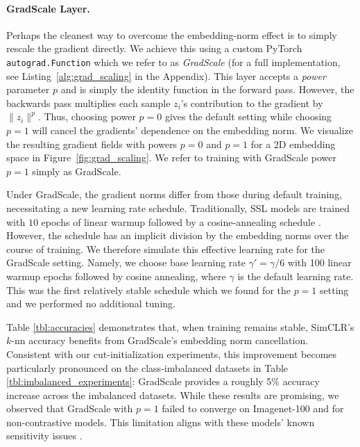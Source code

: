 \paragraph{GradScale Layer.}

Perhaps the cleanest way to overcome the embedding-norm effect is to simply rescale the gradient directly. We achieve this using a custom PyTorch \texttt{autograd.Function} which we refer to as \emph{GradScale} (for a full implementation, see Listing~\ref{alg:grad_scaling} in the Appendix). This layer accepts a \emph{power} parameter $p$ and is simply the identity function in the forward pass. However, the backwards pass multiplies each sample $z_i$'s contribution to the gradient by $\|z_i\|^p$. Thus, choosing power $p=0$ gives the default setting while choosing $p=1$ will cancel the gradients' dependence on the embedding norm. We visualize the resulting gradient fields with powers $p=0$ and $p=1$ for a 2D embedding space in Figure~\ref{fig:grad_scaling}. We refer to training with GradScale power $p=1$ simply as GradScale.

Under GradScale, the gradient norms differ from those during default training, necessitating a new learning rate schedule. Traditionally, SSL models are trained with $10$ epochs of linear warmup followed by a cosine-annealing schedule \citep{simclr}. However, the schedule has an implicit division by the embedding norms over the course of training. 
We therefore simulate this effective learning rate for the GradScale setting. Namely, we choose base learning rate $\gamma' = \gamma/6$ with 100 linear warmup epochs followed by cosine annealing, where $\gamma$ is the default learning rate. This was the first relatively stable schedule which we found for the $p=1$ setting and we performed no additional tuning.

Table \ref{tbl:accuracies} demonstrates that, when training remains stable, SimCLR's $k$-nn accuracy benefits from GradScale's embedding norm cancellation. Consistent with our cut-initialization experiments, this improvement becomes particularly pronounced on the class-imbalanced datasets in Table \ref{tbl:imbalanced_experiments}: GradScale provides a roughly 5\% accuracy increase across the imbalanced datasets. While these results are promising, we observed that GradScale with $p=1$ failed to converge on Imagenet-100 and for non-contrastive models. This limitation aligns with these models' known sensitivity issues \cite{simsiam_avoid_collapse, BYOL_orthogonality}.

